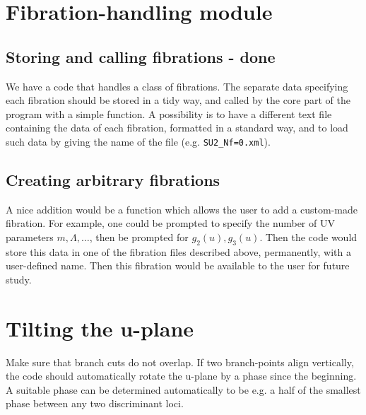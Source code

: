 \documentclass[11pt]{report}
\begin{document}
\section{Fibration-handling module}
\subsection{Storing and calling fibrations - {\color{red} \bf done}}
We have a code that handles a class of fibrations. The separate data specifying each fibration should be stored in a tidy way, and called by the core part of the program with a simple function.
A possibility is to have a different text file containing the data of each fibration, formatted in a standard way, and to load such data by giving the name of the file (e.g. {\tt SU2\_Nf=0.xml}).

\subsection{Creating arbitrary fibrations}
A nice addition would be a function which allows the user to add a custom-made fibration. For example, one could be prompted to specify the number of UV parameters $m,\Lambda,\dots$, then be prompted for $g_{2}(u), g_{3}(u)$. Then the code would store this data in one of the fibration files described above, permanently, with a user-defined name. Then this fibration would be available to the user for future study.



\section{Tilting the u-plane}
Make sure that branch cuts do not overlap. If two branch-points align vertically, the code should automatically rotate the u-plane by a phase since the beginning.
A suitable phase can be determined automatically to be e.g. a half of the smallest phase between any two discriminant loci.
\end{document}
